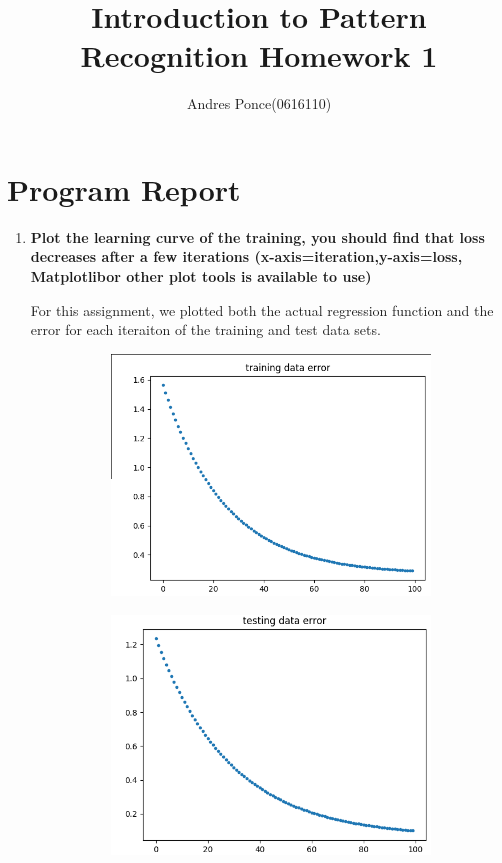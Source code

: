 \documentclass{article}
\title{Introduction to Pattern Recognition Homework 1}
\author{Andres Ponce(0616110)}
\begin{document}
\maketitle

\section{Program Report} %
\begin{enumerate}
		\item \textbf{Plot the learning curve of the training, you should 
				find that loss decreases after a few iterations 
				(x-axis=iteration,y-axis=loss, Matplotlibor other plot tools is available to use)}

				For this assignment, we plotted both the actual regression function and the error
				for each iteraiton of the training and test data sets.
				\begin{figure}[!ht]
					\centering
						\begin{subfigure}{0.4\linewidth}
						\includegraphics[width=\linewidth]{training_data_error.png}
					\end{subfigure}
					\begin{subfigure}{0.4\linewidth}
						\includegraphics[width=\linewidth]{testing_data_error.png}

\end{subfigure}
\end{figure}
\end{enumerate}
\end{document}
